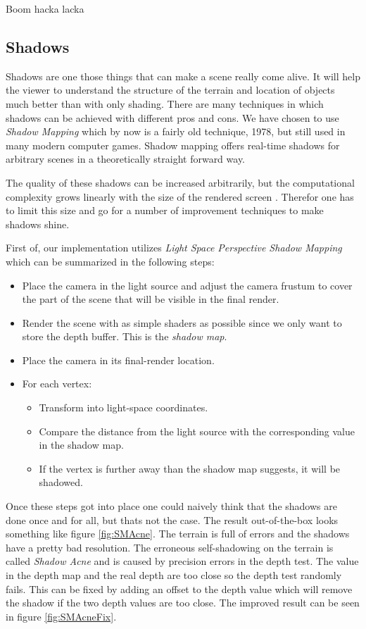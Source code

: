 Boom hacka lacka

\subsection{Shadows}
Shadows are one those things that can make a scene really come alive. It will help the viewer to understand the structure of the terrain and location of objects much better than with only shading. There are many techniques in which shadows can be achieved with different pros and cons. We have chosen to use \textit{Shadow Mapping} \cite{ShadowMapping} which by now is a fairly old technique, 1978, but still used in many modern computer games. Shadow mapping offers real-time shadows for arbitrary scenes in a theoretically straight forward way. 

The quality of these shadows can be increased arbitrarily, but the computational complexity grows linearly with the size of the rendered screen \cite{ShadowMapping}. Therefor one has to limit this size and go for a number of improvement techniques to make shadows shine.

First of, our implementation utilizes \textit{Light Space Perspective Shadow Mapping} \cite{LSPShadowMapping} which can be summarized in the following steps:

\begin{itemize}
\item Place the camera in the light source and adjust the camera frustum to cover the part of the scene that will be visible in the final render.
\item Render the scene with as simple shaders as possible since we only want to store the depth buffer. This is the \textit{shadow map}.
\item Place the camera in its final-render location.
\item For each vertex:
\begin{itemize}
\item Transform into light-space coordinates.
\item Compare the distance from the light source with the corresponding value in the shadow map.
\item If the vertex is further away than the shadow map suggests, it will be shadowed. 
\end{itemize}
\end{itemize}

Once these steps got into place one could naively think that the shadows are done once and for all, but thats not the case. The result out-of-the-box looks something like figure \ref{fig:SMAcne}. The terrain is full of errors and the shadows have a pretty bad resolution. The erroneous self-shadowing on the terrain is called \textit{Shadow Acne} \cite{ImprovedShadowMapping} and is caused by precision errors in the depth test. The value in the depth map and the real depth are too close so the depth test randomly fails. This can be fixed by adding an offset to the depth value which will remove the shadow if the two depth values are too close. The improved result can be seen in figure \ref{fig:SMAcneFix}.

